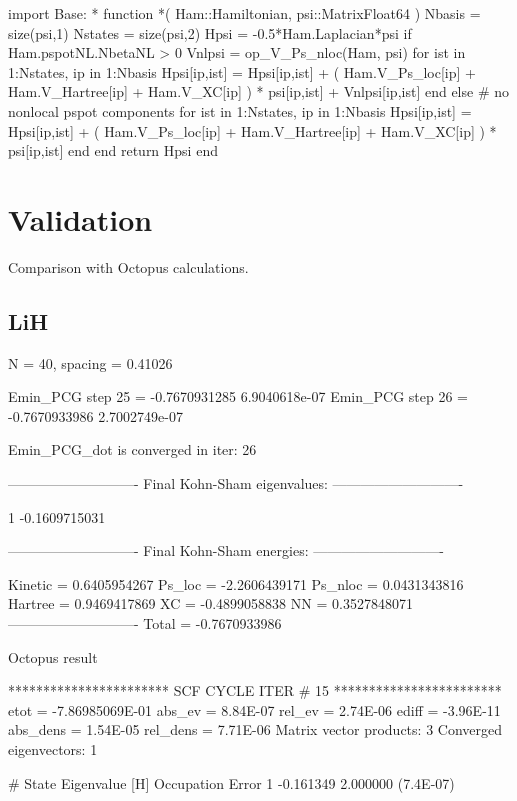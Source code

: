 \begin{juliacode}
import Base: *
function *( Ham::Hamiltonian, psi::Matrix{Float64} )
  Nbasis = size(psi,1)
  Nstates = size(psi,2)
  Hpsi = -0.5*Ham.Laplacian*psi
  if Ham.pspotNL.NbetaNL > 0
    Vnlpsi = op_V_Ps_nloc(Ham, psi)
    for ist in 1:Nstates, ip in 1:Nbasis
        Hpsi[ip,ist] = Hpsi[ip,ist] + ( Ham.V_Ps_loc[ip] +
            Ham.V_Hartree[ip] + Ham.V_XC[ip] ) * psi[ip,ist] + Vnlpsi[ip,ist]
    end
  else # no nonlocal pspot components
    for ist in 1:Nstates, ip in 1:Nbasis
            Hpsi[ip,ist] = Hpsi[ip,ist] + ( Ham.V_Ps_loc[ip] +
                Ham.V_Hartree[ip] + Ham.V_XC[ip] ) * psi[ip,ist]
    end
  end
  return Hpsi
end
\end{juliacode}

\section{Validation}

Comparison with Octopus calculations.

\subsection{LiH}

N = 40, spacing = 0.41026
\begin{textcode}
Emin_PCG step       25 =      -0.7670931285  6.9040618e-07
Emin_PCG step       26 =      -0.7670933986  2.7002749e-07

Emin_PCG_dot is converged in iter: 26

----------------------------
Final Kohn-Sham eigenvalues:
----------------------------

  1      -0.1609715031

----------------------------
Final Kohn-Sham energies:
----------------------------

Kinetic =       0.6405954267
Ps_loc  =      -2.2606439171
Ps_nloc =       0.0431343816
Hartree =       0.9469417869
XC      =      -0.4899058838
NN      =       0.3527848071
----------------------------
Total   =      -0.7670933986
\end{textcode}

Octopus result
\begin{textcode}
*********************** SCF CYCLE ITER #   15 ************************
 etot  = -7.86985069E-01 abs_ev   =  8.84E-07 rel_ev   =  2.74E-06
 ediff =       -3.96E-11 abs_dens =  1.54E-05 rel_dens =  7.71E-06
Matrix vector products:      3
Converged eigenvectors:      1

#  State  Eigenvalue [H]  Occupation    Error
      1       -0.161349    2.000000   (7.4E-07)
\end{textcode}


